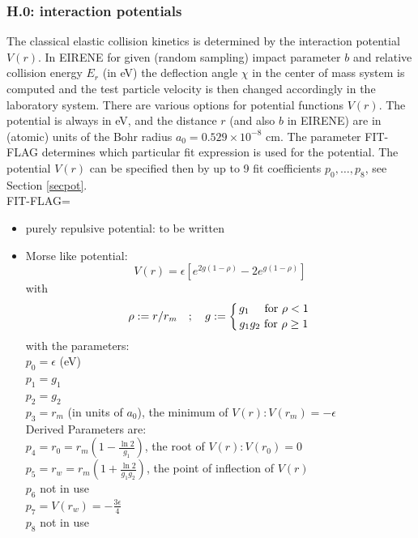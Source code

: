 \documentclass[12pt,dvips]{article}
\begin{document}
\subsubsection*{H.0: interaction potentials}\label{sec1.3.0}
The classical  elastic collision kinetics is determined by the
interaction potential $V(r)$. In EIRENE for given  (random sampling)
impact parameter $b$ and relative collision energy $E_r$ (in eV) the
deflection angle $\chi$ in the center of mass system is computed and
the test particle velocity is then changed accordingly in the
laboratory system. There are various options for potential functions
$V(r)$. The potential is always in eV, and the distance $r$ (and
also $b$ in EIRENE) are in (atomic) units of the Bohr radius
$a_0=0.529 \times 10^{-8}$ cm. The parameter FIT-FLAG determines
which particular fit expression is used for the potential. The
potential $V(r)$ can be specified then by up
to 9 fit coefficients $p_0,\dots,p_8$, see Section \ref{secpot}.\\

FIT-FLAG=
\begin{itemize}
\item [=1]
purely repulsive potential: to be written
\item [=2]
Morse like potential:\\
\begin{equation}\nonumber
V(r) = \epsilon \left[e^{2g(1-\rho)}-2 e^{g(1-\rho)}\right]
\end{equation}
with
\begin{equation}
 \rho:= r/r_m \quad; \quad g:=\left\{ {g_1  \ \  \ \ \mbox{for} \ \rho < 1 \atop g_1g_2
\ \mbox{for} \
 \rho \geq 1} \right.
\end{equation}
with the parameters:\\  $p_0=\epsilon$ (eV)\\ $p_1=g_1$\\ $p_2=g_2
$\\ $p_3=r_m $ (in units of $a_0$), the minimum of $V(r): V(r_m)=-\epsilon$\\
Derived Parameters are: \\
$p_4=r_0=r_m\left(1-\frac{\ln 2}{g_1}\right)$, the root of $V(r):
V(r_0)=0$\\
$p_5=r_w=r_m\left(1+\frac{\ln 2}{g_1g_2}\right)$, the point of
inflection of $V(r)$\\
$p_6$  not in use\\
$p_7  = V(r_w)=-\frac{3\epsilon}{4}$ \\
$p_8$  not in use
\end{itemize}
\end{document}
